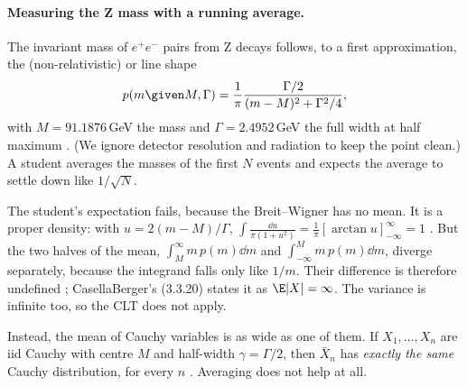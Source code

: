 \paragraph{Measuring the Z mass with a running average.}
The invariant mass of $e^+e^-$ pairs from Z decays follows, to a first approximation, the (non-relativistic)  or  line shape
\begin{equation}
  p(m\given M,\Gamma)=\frac1\pi\frac{\Gamma/2}{(m-M)^2+\Gamma^2/4},
  \label{2b:eq:bw}
\end{equation}
with $M=91.1876$\,GeV the mass and $\Gamma=2.4952$\,GeV the full width at half maximum . (We ignore detector resolution and radiation to keep the point clean.) A student averages the masses of the first $N$ events and expects the average to settle down like $1/\sqrt N$.

The student's expectation fails, because the Breit--Wigner has no mean. It is a proper density: with $u=2(m-M)/\Gamma$, $\int\frac{\dd u}{\pi(1+u^2)}=\frac1\pi[\arctan u]_{-\infty}^{\infty}=1$ . But the two halves of the mean, $\int_M^\infty m\,p(m)\dd m$ and $\int_{-\infty}^M m\,p(m)\dd m$, diverge separately, because the integrand falls only like $1/m$. Their difference is therefore undefined ; CasellaBerger's (3.3.20) states it as $\E|X|=\infty$. The variance is infinite too, so the CLT does not apply.

Instead, the mean of Cauchy variables is as wide as one of them. If $X_1,\dots,X_n$ are iid Cauchy with centre $M$ and half-width $\gamma=\Gamma/2$, then $\bar X_n$ has \emph{exactly the same} Cauchy distribution, for every $n$ . Averaging does not help at all.

